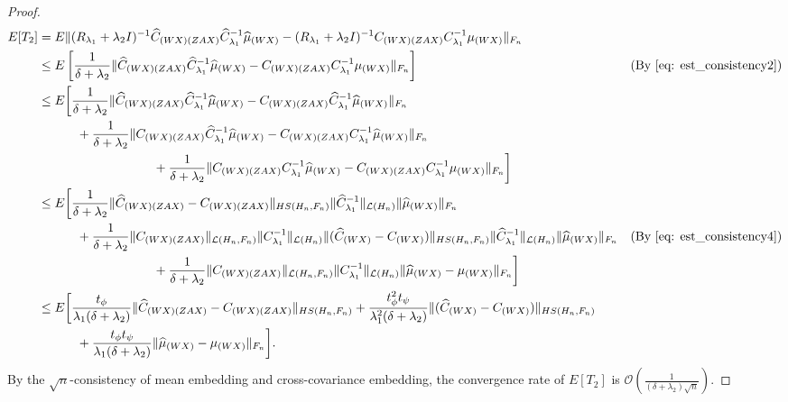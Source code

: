 \begin{proof}
    \begin{align}
        \label{eq: est_consistency6}
        E[T_2] &= E\|(R_{\lambda_1}+\lambda_2I)^{-1}\widehat{C}_{(WX)(ZAX)}\widehat{C}^{-1}_{\lambda_1}\widehat{\mu}_{(WX)}-(R_{\lambda_1}+\lambda_2I)^{-1}C_{(WX)(ZAX)}C^{-1}_{\lambda_1}\mu_{(WX)}\|_{F_n} \notag \\
            &\leq E\left[\frac{1}{\delta+\lambda_2} \|\widehat{C}_{(WX)(ZAX)}\widehat{C}^{-1}_{\lambda_1}\widehat{\mu}_{(WX)}-C_{(WX)(ZAX)}C^{-1}_{\lambda_1}\mu_{(WX)}\|_{F_n}\right] & (\text{By \ref{eq: est_consistency2}}) \notag \\
            &\leq E\bigg[\frac{1}{\delta+\lambda_2} \|\widehat{C}_{(WX)(ZAX)}\widehat{C}^{-1}_{\lambda_1}\widehat{\mu}_{(WX)}-C_{(WX)(ZAX)}\widehat{C}^{-1}_{\lambda_1}\widehat{\mu}_{(WX)}\|_{F_n} \notag \\
            &\phantom{\frac{1}{\lambda_2} \|\widehat{C}\|} + \frac{1}{\delta+\lambda_2}\|C_{(WX)(ZAX)}\widehat{C}^{-1}_{\lambda_1}\widehat{\mu}_{(WX)}-C_{(WX)(ZAX)}C^{-1}_{\lambda_1}\widehat{\mu}_{(WX)}\|_{F_n} \notag \\
            &\phantom{\frac{1}{\lambda_2} \|\widehat{C}_{(WX)(ZAX)}\widehat{C}^{-1}_{\lambda_1}} + \frac{1}{\delta+\lambda_2}\|C_{(WX)(ZAX)}C^{-1}_{\lambda_1}\widehat{\mu}_{(WX)}-C_{(WX)(ZAX)}C^{-1}_{\lambda_1}\mu_{(WX)}\|_{F_n}\bigg] \notag \\
            &\leq E\bigg[\frac{1}{\delta+\lambda_2} \|\widehat{C}_{(WX)(ZAX)}-C_{(WX)(ZAX)}\|_{HS(H_n,F_n)} \|\widehat{C}^{-1}_{\lambda_1}\|_{\mathcal{L}(H_n)} \|\widehat{\mu}_{(WX)}\|_{F_n} \notag \\
            &\phantom{\frac{1}{\lambda_2} \|\widehat{C}\|} + \frac{1}{\delta+\lambda_2} \|C_{(WX)(ZAX)}\|_{\mathcal{L}(H_n,F_n)} \|C^{-1}_{\lambda_1}\|_{\mathcal{L}(H_n)} \|(\widehat{C}_{(WX)}-C_{(WX)})\|_{HS(H_n,F_n)} \|\widehat{C}^{-1}_{\lambda_1}\|_{\mathcal{L}(H_n)} \|\widehat{\mu}_{(WX)}\|_{F_n} & (\text{By \ref{eq: est_consistency4}}) \notag \\
            &\phantom{\frac{1}{\lambda_2} \|\widehat{C}_{(WX)(ZAX)}\widehat{C}^{-1}_{\lambda_1}} + \frac{1}{\delta+\lambda_2}\|C_{(WX)(ZAX)}\|_{\mathcal{L}(H_n,F_n)} \|C^{-1}_{\lambda_1}\|_{\mathcal{L}(H_n)} \|\widehat{\mu}_{(WX)}-\mu_{(WX)}\|_{F_n}\bigg] \notag \\
            &\leq E\bigg[\frac{t_{\phi}}{\lambda_1(\delta+\lambda_2)} \|\widehat{C}_{(WX)(ZAX)}-C_{(WX)(ZAX)}\|_{HS(H_n,F_n)} + \frac{t^2_{\phi}t_{\psi}}{\lambda^2_1(\delta+\lambda_2)}\|(\widehat{C}_{(WX)}-C_{(WX)})\|_{HS(H_n,F_n)} \notag \\
            &\phantom{\frac{1}{\lambda_2} \|\widehat{C}\|} + \frac{t_{\phi}t_{\psi}}{\lambda_1(\delta+\lambda_2)}\|\widehat{\mu}_{(WX)}-\mu_{(WX)}\|_{F_n}\bigg]. 
    \end{align}
    By the $\sqrt{n}$-consistency of mean embedding and cross-covariance embedding, 
    the convergence rate of $E[T_2]$ is $\mathcal{O}(\frac{1}{(\delta+\lambda_2)\sqrt{n}})$. 


\end{proof}
